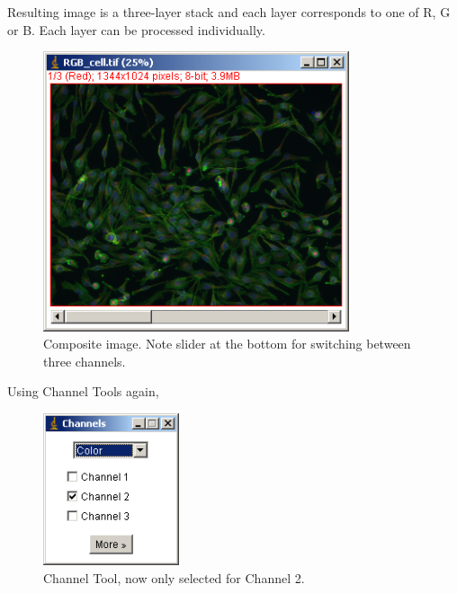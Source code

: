 \begin{indentexercise}{1}
Resulting image is a three-layer stack and each layer corresponds to one
of R, G or B. Each layer can be processed individually. 
\begin{figure}[H]
\begin{center}
\includegraphics[width=9cm]{img/CMCIBasicCourse201102-img16.png}
\caption{ Composite image. Note slider at the bottom for switching between three channels.}
\label{fig:img16}
\end{center}
\end{figure}

Using Channel Tools again,
\begin{figure}[H]
\begin{center}
\includegraphics[width=4cm]{img/CMCIBasicCourse201102-img17.png}
\caption{ Channel Tool, now only selected for Channel 2.}
\label{fig:img17}
\end{center}
\end{figure}


\end{indentexercise}
